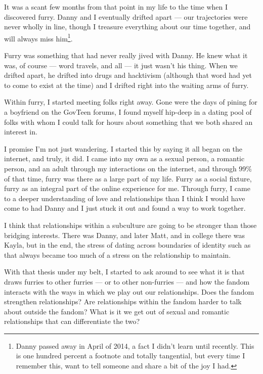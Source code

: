It was a scant few months from that point in my life to the time when I discovered furry.  Danny and I eventually drifted apart --- our trajectories were never wholly in line, though I treasure everything about our time together, and will always miss him\footnote{Danny passed away in April of 2014, a fact I didn't learn until recently.  This is one hundred percent a footnote and totally tangential, but every time I remember this, want to tell someone and share a bit of the joy I had.}.

Furry was something that had never really jived with Danny.  He knew what it was, of course --- word travels, and all --- it just wasn't his thing.  When we drifted apart, he drifted into drugs and hacktivism (although that word had yet to come to exist at the time) and I drifted right into the waiting arms of furry.

Within furry, I started meeting folks right away.  Gone were the days of pining for a boyfriend on the GovTeen forums, I found myself hip-deep in a dating pool of folks with whom I could talk for hours about something that we both shared an interest in.

I promise I'm not just wandering.  I started this by saying it all began on the internet, and truly, it did.  I came into my own as a sexual person, a romantic person, and an adult through my interactions on the internet, and through 99\% of that time, furry was there as a large part of my life. Furry as a social fixture, furry as an integral part of the online experience for me.  Through furry, I came to a deeper understanding of love and relationships than I think I would have come to had Danny and I just stuck it out and found a way to work together.

I think that relationships within a subculture are going to be stronger than those bridging interests.  There was Danny, and later Matt, and in college there was Kayla, but in the end, the stress of dating across boundaries of identity such as that always became too much of a stress on the relationship to maintain.

With that thesis under my belt, I started to ask around to see what it is that draws furries to other furries --- or to other non-furries --- and how the fandom interacts with the ways in which we play out our relationships.  Does the fandom strengthen relationships?  Are relationships within the fandom harder to talk about outside the fandom?  What is it we get out of sexual and romantic relationships that can differentiate the two?

